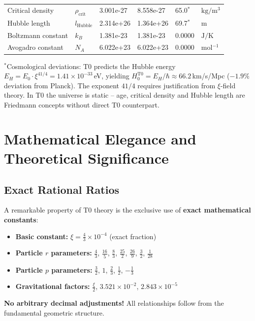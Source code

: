 \begin{longtable}{>{\raggedright}p{4.0cm}p{1.2cm}p{1.8cm}p{2.0cm}p{1.6cm}p{2.0cm}}
		Critical density & $\rho_{\text{crit}}$ & 3.001e-27 & 8.558e-27 & 65.0$^*$ & $\si{\kilogram \per \meter^3}$ \\
		Hubble length & $l_{\text{Hubble}}$ & 2.314e+26 & 1.364e+26 & 69.7$^*$ & $\si{\meter}$ \\
		Boltzmann constant & $k_B$ & 1.381e-23 & 1.381e-23 & 0.0000 & $\si{\joule \per \kelvin}$ \\
		Avogadro constant & $N_A$ & 6.022e+23 & 6.022e+23 & 0.0000 & $\si{\mole^{-1}}$ \\
	\end{longtable}
	\normalsize
	
	{\small $^*$Cosmological deviations: T0 predicts the Hubble energy $E_H = E_0 \cdot \xi^{41/4} = 1.41 \times 10^{-33}\,$eV, yielding $H_0^{\text{T0}} = E_H/\hbar \approx 66.2\,$km/s/Mpc ($-1.9\%$ deviation from Planck). The exponent $41/4$ requires justification from $\xi$-field theory. In T0 the universe is static -- age, critical density and Hubble length are Friedmann concepts without direct T0 counterpart.}
	
	\section{Mathematical Elegance and Theoretical Significance}
	
	\subsection{Exact Rational Ratios}
	
	A remarkable property of T0 theory is the exclusive use of \textbf{exact mathematical constants}:
	
	\begin{itemize}
		\item \textbf{Basic constant:} $\xi = \frac{4}{3} \times 10^{-4}$ (exact fraction)
		\item \textbf{Particle $r$ parameters:} $\frac{4}{3}$, $\frac{16}{5}$, $\frac{8}{3}$, $\frac{25}{2}$, $\frac{26}{9}$, $\frac{3}{2}$, $\frac{1}{28}$
		\item \textbf{Particle $p$ parameters:} $\frac{3}{2}$, $1$, $\frac{2}{3}$, $\frac{1}{2}$, $-\frac{1}{3}$
		\item \textbf{Gravitational factors:} $\frac{\xi}{2}$, $3.521 \times 10^{-2}$, $2.843 \times 10^{-5}$
	\end{itemize}
	
	\textcolor{t0green}{\textbf{No arbitrary decimal adjustments!}} All relationships follow from the fundamental geometric structure.
	
